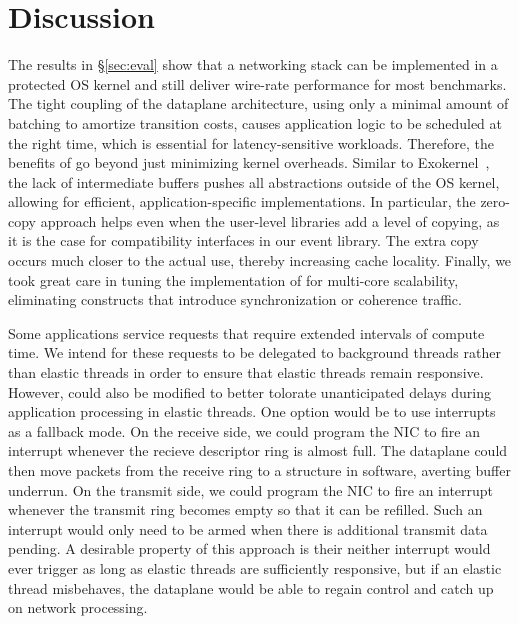 
\section{Discussion}
\label{sec:disc}


 The results in \S\ref{sec:eval}
show that a networking stack can be implemented in a protected OS
kernel and still deliver wire-rate performance for most benchmarks.
The tight coupling of the dataplane architecture, using only a minimal
amount of batching to amortize transition costs, causes application
logic to be scheduled at the right time, which is essential for
latency-sensitive workloads.  Therefore, the benefits of \ix go beyond
just minimizing kernel overheads. Similar to
Exokernel~\cite{DBLP:conf/sosp/EnglerKO95}, the lack of intermediate
buffers pushes all abstractions outside of the OS kernel, allowing for
efficient, application-specific implementations.  In particular, the
zero-copy approach helps even when the user-level libraries add a
level of copying, as it is the case for compatibility interfaces in
our event library.  The extra copy occurs much closer to the actual
use, thereby increasing cache locality.  Finally, we took great care
in tuning the implementation of \ix for multi-core scalability,
eliminating constructs that introduce synchronization or coherence
traffic.

 Some applications
service requests that require extended intervals of
compute time. We intend for these requests to be delegated
to background threads rather than elastic threads in order
to ensure that elastic threads remain responsive.
However, \ix could also be modified to better tolorate
unanticipated delays during application processing in elastic threads.
One option would be to use interrupts as a fallback mode. On the receive side, we
could program the NIC to fire an interrupt whenever the
recieve descriptor ring is almost full. The dataplane could
then move packets from the receive ring to a structure in software, averting
buffer underrun. On the transmit side, we could program
the NIC to fire an interrupt whenever the transmit ring becomes
empty so that it can be refilled. Such an interrupt would only need
to be armed when there is additional transmit data pending. A desirable
property of this approach is their neither interrupt would
ever trigger as long as elastic threads are sufficiently responsive,
but if an elastic thread misbehaves, the \ix dataplane would
be able to regain control and catch up on network processing.



